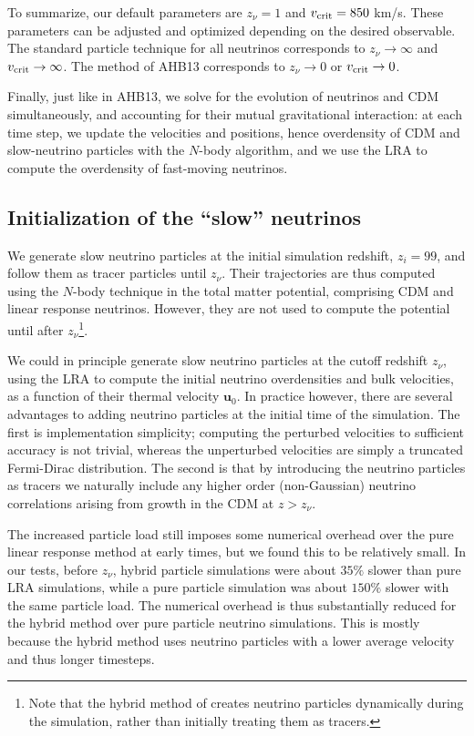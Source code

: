 \documentclass[useAMS, usenatbib]{mnras}
\newcommand{\bs}{\boldsymbol}
\begin{document}
To summarize, our default parameters are $z_\nu = 1$ and $v_{\rm crit} = 850$ km/s. These parameters can be adjusted and optimized depending on the desired observable. The standard particle technique for all neutrinos corresponds to $z_\nu \rightarrow \infty$ and $v_{\rm crit} \rightarrow \infty$. The method of AHB13 corresponds to $z_\nu \rightarrow 0$ or $v_{\rm crit} \rightarrow 0$.

Finally, just like in AHB13, we solve for the evolution of neutrinos and CDM simultaneously, and accounting for their mutual gravitational interaction: at each time step, we update the velocities and positions, hence overdensity of CDM and slow-neutrino particles with the $N$-body algorithm, and we use the LRA to compute the overdensity of fast-moving neutrinos.

\subsection{Initialization of the ``slow'' neutrinos}

We generate slow neutrino particles at the initial simulation redshift, $z_i = 99$, and follow them as tracer particles until $z_\nu$. Their trajectories are thus computed using the $N$-body technique in the total matter potential, comprising CDM and linear response neutrinos. However, they are not used to compute the potential until after $z_\nu$\footnote{Note that the hybrid method of \cite{Brandbyge_2010} creates neutrino particles dynamically during the simulation, rather than initially treating them as tracers.}.

We could in principle generate slow neutrino particles at the cutoff redshift $z_\nu$, using the LRA to compute the initial neutrino overdensities and bulk velocities, as a function of their thermal velocity $\bs{u}_0$. In practice however, there are several advantages to adding neutrino particles at the initial time of the simulation. The first is implementation simplicity; computing the perturbed velocities to sufficient accuracy is not trivial, whereas the unperturbed velocities are simply a truncated Fermi-Dirac distribution. The second is that by introducing the neutrino particles as tracers we naturally include any higher order (non-Gaussian) neutrino correlations arising from growth in the CDM at $z > z_\nu$.

The increased particle load still imposes some numerical overhead over the pure linear response method at early times, but we found this to be relatively small. In our tests, before $z_\nu$, hybrid particle simulations were about $35\%$ slower than pure LRA simulations, while a pure particle simulation was about $150\%$ slower with the same particle load.
The numerical overhead is thus substantially reduced for the hybrid method over pure particle neutrino simulations. This is mostly because the hybrid method uses neutrino particles with a lower average velocity and thus longer timesteps.
\end{document}
